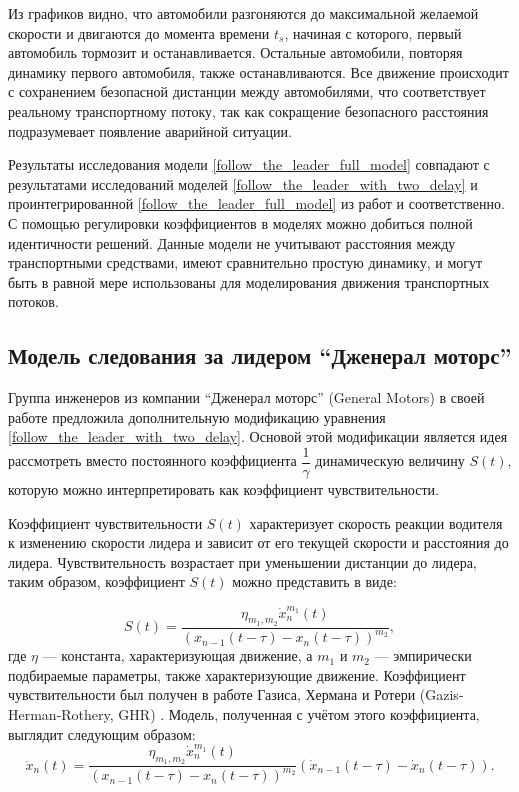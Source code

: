 \documentclass[12pt, a4paper]{extarticle}
\numberwithin{equation}{section}
\numberwithin{figure}{section}
\begin{document}
Из графиков видно, что автомобили разгоняются до максимальной желаемой скорости и двигаются до момента времени $t_s$, начиная с которого, первый автомобиль тормозит и останавливается. Остальные автомобили, повторяя динамику первого автомобиля, также останавливаются. Все движение происходит с сохранением безопасной дистанции между автомобилями, что соответствует реальному транспортному потоку, так как сокращение безопасного расстояния подразумевает появление аварийной ситуации.

Результаты исследования модели \eqref{follow_the_leader_full_model} совпадают с  результатами исследований моделей \eqref{follow_the_leader_with_two_delay} и проинтегрированной \eqref{follow_the_leader_full_model} из работ \cite{RefineFirstFollowTheLeaderModel} и \cite{Course} соответственно. С помощью регулировки коэффициентов в моделях можно добиться полной идентичности решений. Данные модели не учитывают расстояния между транспортными средствами, имеют сравнительно простую динамику, и могут быть в равной мере использованы для моделирования движения транспортных потоков. 

\subsection{Модель следования за лидером ``Дженерал моторс''}

Группа инженеров из компании ``Дженерал моторс'' (General Motors) в своей работе \cite{GazisModel} предложила дополнительную модификацию уравнения  \eqref{follow_the_leader_with_two_delay}. Основой этой модификации является идея рассмотреть вместо постоянного коэффициента $\dfrac{1}{\gamma}$ динамическую величину $S(t)$, которую можно интерпретировать как коэффициент чувствительности. 

Коэффициент чувствительности $S(t)$ характеризует скорость реакции водителя к изменению скорости лидера и зависит от его текущей скорости и расстояния до лидера. Чувствительность возрастает при уменьшении дистанции до лидера, таким образом, коэффициент $S(t)$ можно представить в виде:

\begin{equation} \label{gazis_coefficient}
S(t) = \dfrac{\eta_{m_1,m_2}\dot{x}_n^{m_1}(t)}{(x_{n-1}(t-\tau)-x_n(t-\tau))^{m_2}},
\end{equation}
где $\eta$ --- константа, характеризующая движение, а $m_1$ и $m_2$ --- эмпирически подбираемые параметры, также характеризующие движение. Коэффициент чувствительности был получен в работе Газиса, Хермана и Ротери (Gazis-Herman-Rothery, GHR)  \cite{GazisModel}. Модель, полученная с учётом этого коэффициента, выглядит следующим образом:   
\begin{equation} \label{gazis_model}
\ddot{x}_n(t) = \dfrac{\eta_{m_1,m_2}\dot{x}_n^{m_1}(t)}{(x_{n-1}(t-\tau)-x_n(t-\tau))^{m_2}} (\dot{x}_{n-1}(t-\tau) - \dot{x}_{n}(t-\tau)).
\end{equation}
\end{document}
